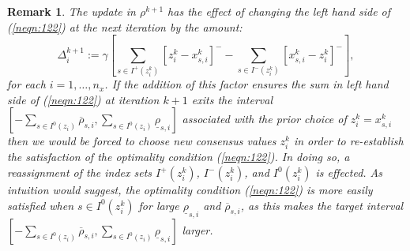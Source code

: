\documentclass[preprint, 1p, review]{elsarticle}
\newtheorem{remark}[theorem]{Remark}
\begin{document}
\begin{remark}
The update in $\rho^{k+1}$ has the effect of changing the left hand side of  (\ref{neqn:122}) at the next iteration by the amount:
\begin{equation}
\Delta^{k+1}_i := \gamma \left[\sum_{s \in I^{+}(z^k_i)}[z^k_i - x_{s,i}^k]^{-} - \sum_{s\in I^{-} (z^k_i)} [x^k_{s,i} - z^k_i]^{-}    \right], \label{neqn:123}
\end{equation}
for each $i=1,\dots, n_x$. 
If the addition of this factor ensures the sum in left hand side of (\ref{neqn:122}) at iteration $k+1$ exits the interval 
$\left[ -\sum_{s \in I^{0} (z_i)}\overline{\rho}_{s,i},\sum_{s \in I^{0} (z_i)}\underline{\rho}_{s,i}  \right]$ associated with the prior choice of $z^k_i =x^k_{s,i}$ then we would be forced to choose new consensus values $z^{k}_i$ in order to re-establish the satisfaction of the optimality condition (\ref{neqn:122}). In doing so, a reassignment of the index sets $I^{+} (z_i^k)$, $I^{-} (z_i^k)$, and $I^{0} (z_i^k)$ is effected. As intuition would suggest, the optimality condition (\ref{neqn:122}) is more easily satisfied when $s \in I^{0}(z_i^k)$ for large $\underline{\rho}_{s,i}$ and $\overline{\rho}_{s,i}$, as this makes the target interval $\left[ -\sum_{s \in I^{0} (z_i)}\overline{\rho}_{s,i},\sum_{s \in I^{0} (z_i)}\underline{\rho}_{s,i}  \right]$ larger.
\end{remark}

\end{document}
